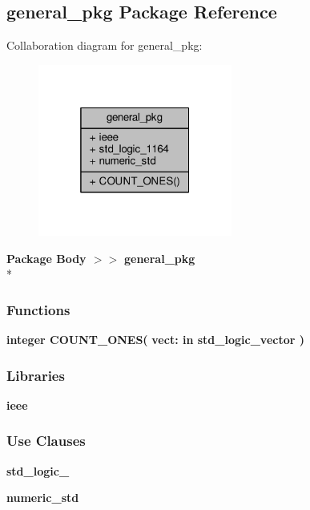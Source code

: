 \subsection{general\+\_\+pkg Package Reference}
\label{classgeneral__pkg}


Collaboration diagram for general\+\_\+pkg\+:\nopagebreak
\begin{figure}[H]
\begin{center}
\leavevmode
\includegraphics[width=181pt]{de/da2/classgeneral__pkg__coll__graph}
\end{center}
\end{figure}
{\bfseries Package Body $>$$>$ }{\bf general\+\_\+pkg}\\*
\subsubsection*{Functions}
 \begin{DoxyCompactItemize}
\item 
{\bfseries {\bfseries \textcolor{comment}{integer}\textcolor{vhdlchar}{ }}} {\bf C\+O\+U\+N\+T\+\_\+\+O\+N\+ES}{\bfseries  ( }{\bfseries \textcolor{vhdlchar}{vect\+: }\textcolor{stringliteral}{in }{\bfseries \textcolor{comment}{std\+\_\+logic\+\_\+vector}\textcolor{vhdlchar}{ }}}{\bfseries  )} 
\end{DoxyCompactItemize}
\subsubsection*{Libraries}
 \begin{DoxyCompactItemize}
\item 
{\bf ieee} 
\end{DoxyCompactItemize}
\subsubsection*{Use Clauses}
 \begin{DoxyCompactItemize}
\item 
{\bf std\+\_\+logic\+\_}   
\item 
{\bf numeric\+\_\+std}   
\end{DoxyCompactItemize}



